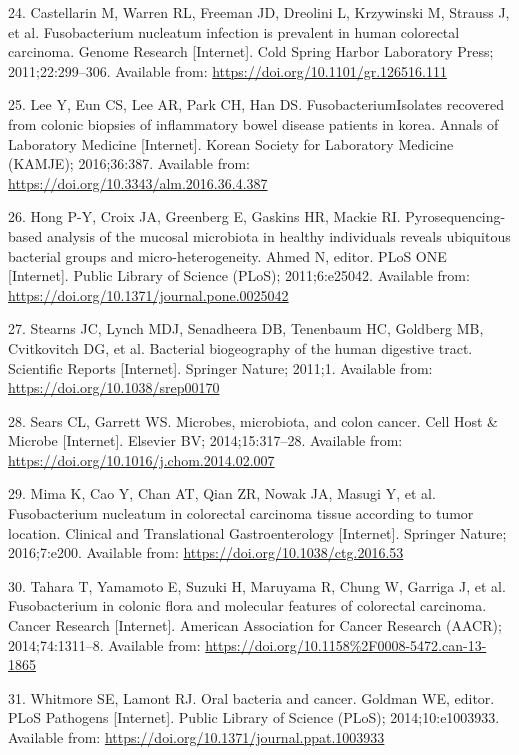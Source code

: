 \documentclass[12pt,]{article}
\begin{document}
\hypertarget{ref-Castellarin2011}{}
24. Castellarin M, Warren RL, Freeman JD, Dreolini L, Krzywinski M,
Strauss J, et al. Fusobacterium nucleatum infection is prevalent in
human colorectal carcinoma. Genome Research {[}Internet{]}. Cold Spring
Harbor Laboratory Press; 2011;22:299--306. Available from:
\url{https://doi.org/10.1101/gr.126516.111}

\hypertarget{ref-Lee2016}{}
25. Lee Y, Eun CS, Lee AR, Park CH, Han DS. FusobacteriumIsolates
recovered from colonic biopsies of inflammatory bowel disease patients
in korea. Annals of Laboratory Medicine {[}Internet{]}. Korean Society
for Laboratory Medicine (KAMJE); 2016;36:387. Available from:
\url{https://doi.org/10.3343/alm.2016.36.4.387}

\hypertarget{ref-Hong2011}{}
26. Hong P-Y, Croix JA, Greenberg E, Gaskins HR, Mackie RI.
Pyrosequencing-based analysis of the mucosal microbiota in healthy
individuals reveals ubiquitous bacterial groups and micro-heterogeneity.
Ahmed N, editor. PLoS ONE {[}Internet{]}. Public Library of Science
(PLoS); 2011;6:e25042. Available from:
\url{https://doi.org/10.1371/journal.pone.0025042}

\hypertarget{ref-Stearns2011}{}
27. Stearns JC, Lynch MDJ, Senadheera DB, Tenenbaum HC, Goldberg MB,
Cvitkovitch DG, et al. Bacterial biogeography of the human digestive
tract. Scientific Reports {[}Internet{]}. Springer Nature; 2011;1.
Available from: \url{https://doi.org/10.1038/srep00170}

\hypertarget{ref-Sears2014}{}
28. Sears CL, Garrett WS. Microbes, microbiota, and colon cancer. Cell
Host \& Microbe {[}Internet{]}. Elsevier BV; 2014;15:317--28. Available
from: \url{https://doi.org/10.1016/j.chom.2014.02.007}

\hypertarget{ref-Mima2016}{}
29. Mima K, Cao Y, Chan AT, Qian ZR, Nowak JA, Masugi Y, et al.
Fusobacterium nucleatum in colorectal carcinoma tissue according to
tumor location. Clinical and Translational Gastroenterology
{[}Internet{]}. Springer Nature; 2016;7:e200. Available from:
\url{https://doi.org/10.1038/ctg.2016.53}

\hypertarget{ref-Tahara_2014}{}
30. Tahara T, Yamamoto E, Suzuki H, Maruyama R, Chung W, Garriga J, et
al. Fusobacterium in colonic flora and molecular features of colorectal
carcinoma. Cancer Research {[}Internet{]}. American Association for
Cancer Research (AACR); 2014;74:1311--8. Available from:
\url{https://doi.org/10.1158\%2F0008-5472.can-13-1865}

\hypertarget{ref-Whitmore2014}{}
31. Whitmore SE, Lamont RJ. Oral bacteria and cancer. Goldman WE,
editor. PLoS Pathogens {[}Internet{]}. Public Library of Science (PLoS);
2014;10:e1003933. Available from:
\url{https://doi.org/10.1371/journal.ppat.1003933}
\end{document}
